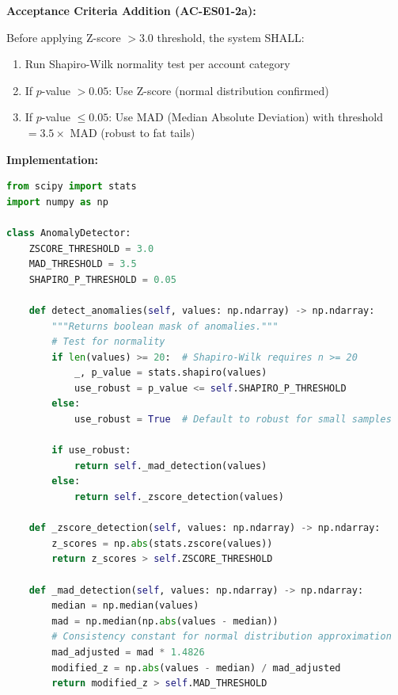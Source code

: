 \begin{tcolorbox}[colback=green!5,colframe=green!70,title=\faIcon{check-circle} Resolution: Normality Testing with MAD Fallback]
\textbf{Acceptance Criteria Addition (AC-ES01-2a):}

Before applying Z-score $> 3.0$ threshold, the system SHALL:
\begin{enumerate}
    \item Run Shapiro-Wilk normality test per account category
    \item If $p$-value $> 0.05$: Use Z-score (normal distribution confirmed)
    \item If $p$-value $\leq 0.05$: Use MAD (Median Absolute Deviation) with 
          threshold $= 3.5 \times$ MAD (robust to fat tails)
\end{enumerate}
\end{tcolorbox}

\textbf{Implementation:}

\begin{lstlisting}[language=Python,caption={Normality Test with MAD Fallback}]
from scipy import stats
import numpy as np

class AnomalyDetector:
    ZSCORE_THRESHOLD = 3.0
    MAD_THRESHOLD = 3.5
    SHAPIRO_P_THRESHOLD = 0.05
    
    def detect_anomalies(self, values: np.ndarray) -> np.ndarray:
        """Returns boolean mask of anomalies."""
        # Test for normality
        if len(values) >= 20:  # Shapiro-Wilk requires n >= 20
            _, p_value = stats.shapiro(values)
            use_robust = p_value <= self.SHAPIRO_P_THRESHOLD
        else:
            use_robust = True  # Default to robust for small samples
        
        if use_robust:
            return self._mad_detection(values)
        else:
            return self._zscore_detection(values)
    
    def _zscore_detection(self, values: np.ndarray) -> np.ndarray:
        z_scores = np.abs(stats.zscore(values))
        return z_scores > self.ZSCORE_THRESHOLD
    
    def _mad_detection(self, values: np.ndarray) -> np.ndarray:
        median = np.median(values)
        mad = np.median(np.abs(values - median))
        # Consistency constant for normal distribution approximation
        mad_adjusted = mad * 1.4826
        modified_z = np.abs(values - median) / mad_adjusted
        return modified_z > self.MAD_THRESHOLD
\end{lstlisting}

